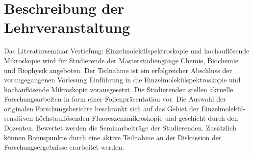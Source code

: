 \section{Beschreibung der Lehrveranstaltung}
Das Literaturseminar Vertiefung: Einzelmolekülspektroskopie und hochauflösende Mikroskopie wird für Studierende der Masterstudiengänge Chemie, Biochemie und Biophysik angeboten. Der Teilnahme ist ein erfolgreicher Abschluss der vorangegangenen Vorlesung Einführung in die Einzelmolekülspektroskopie und hochauflösende Mikroskopie vorausgesetzt. Die Studierenden stellen aktuelle Forschungsarbeiten in form einer Folienpräsentation vor. Die Auswahl der originalen Forschungsberichte beschränkt sich auf das Gebiet der Einzelmolekül-sensitiven höchstauflösenden Fluoreszenzmikroskopie und geschieht durch den Dozenten. Bewertet werden die Seminarbeiträge der Studierenden. Zusätzlich können Bonuspunkte durch eine aktive Teilnahme an der Diskussion der Forschungsergebnisse erarbeitet werden.